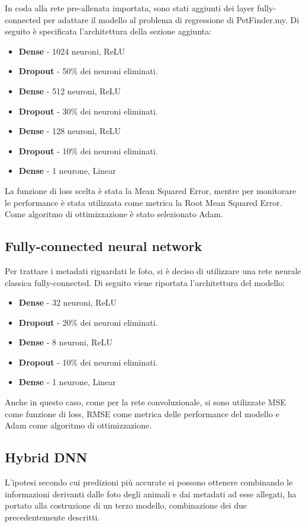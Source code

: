         In coda alla rete pre-allenata importata, sono stati aggiunti dei layer fully-connected per adattare il modello al problema di regressione di PetFinder.my. Di seguito
        è specificata l'architettura della sezione aggiunta:
        \begin{itemize}
            \item \textbf{Dense} - 1024 neuroni, ReLU
            \item \textbf{Dropout} - 50\% dei neuroni eliminati.
            \item \textbf{Dense} - 512 neuroni, ReLU
            \item \textbf{Dropout} - 30\% dei neuroni eliminati.
            \item \textbf{Dense} - 128 neuroni, ReLU
            \item \textbf{Dropout} - 10\% dei neuroni eliminati.
            \item \textbf{Dense} - 1 neurone, Linear
        \end{itemize}
        La funzione di loss scelta è stata la Mean Squared Error, mentre per monitorare le performance è stata utilizzata come metrica la Root Mean Squared Error. Come algoritmo di ottimizzazione è stato selezionato Adam.

    \subsection{Fully-connected neural network}
    \label{mlp}
    Per trattare i metadati riguardati le foto, si è deciso di utilizzare una rete neurale classica fully-connected. Di seguito viene 
    riportata l'architettura del modello:
    \begin{itemize}
        \item \textbf{Dense} - 32 neuroni, ReLU
        \item \textbf{Dropout} - 20\% dei neuroni eliminati.
        \item \textbf{Dense} - 8 neuroni, ReLU
        \item \textbf{Dropout} - 10\% dei neuroni eliminati.
        \item \textbf{Dense} - 1 neurone, Linear
    \end{itemize}
    Anche in questo caso, come per la rete convoluzionale, si sono utilizzate MSE come funzione di loss, RMSE come metrica delle performance del modello e Adam come algoritmo di ottimizzazione.

    \subsection{Hybrid DNN}
    \label{mulinput}
    L'ipotesi secondo cui predizioni più accurate si possono ottenere combinando le informazioni derivanti dalle foto degli animali e dai metadati ad esse allegati, ha portato alla
    costruzione di un terzo modello, combinazione dei due precedentemente descritti.

